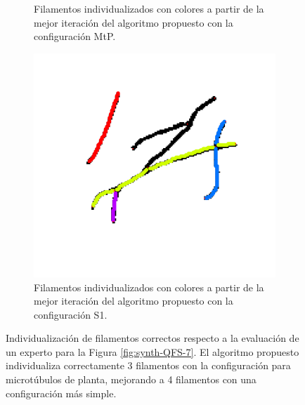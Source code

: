 \begin{figure}[h!]
\begin{subfigure}[t]{0.47\textwidth}
        \caption{Filamentos individualizados con colores a partir de la mejor iteraci\'on del algoritmo propuesto con la configuraci\'on MtP.}
        \label{fig:SynthQFS7-Individualizacion-BestP1}
    \end{subfigure}
    \hspace{0.2cm}
    \begin{subfigure}[t]{0.47\textwidth}
        \centering
        \includegraphics[scale=0.13]{resultImages/Synth-QuantitativeIFS-Fig7-phil-s1271-v056-exactMatch-antLabeled.png}
        \caption{Filamentos individualizados con colores a partir de la mejor iteraci\'on del algoritmo propuesto con la configuraci\'on S1.}
        \label{fig:SynthQFS7-Individualizacion-BestP2}
    \end{subfigure}
        
    \caption[Individualizaci\'on de filamentos correctos respecto a la evaluaci\'on de un experto para la Figura \ref{fig:synth-QFS-7}.]{Individualizaci\'on de filamentos correctos respecto a la evaluaci\'on de un experto para la Figura \ref{fig:synth-QFS-7}. El algoritmo propuesto individualiza correctamente 3 filamentos con la configuraci\'on para microt\'ubulos de planta, mejorando a 4 filamentos con una configuraci\'on m\'as simple.}
    \label{fig:Synth-QIFS-Result}
\end{figure}





